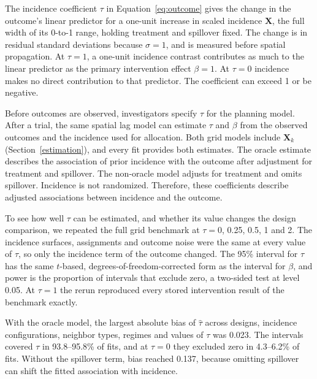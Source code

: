 \documentclass[11pt]{article}
\begin{document}
The incidence coefficient \(\tau\) in Equation~\ref{eq:outcome} gives
the change in the outcome's linear predictor for a one-unit increase in
scaled incidence \(\mathbf{X}\), the full width of its 0-to-1 range,
holding treatment and spillover fixed. The change is in residual
standard deviations because \(\sigma=1\), and is measured before
spatial propagation. At \(\tau=1\), a one-unit incidence contrast
contributes as much to the linear predictor as the primary intervention
effect \(\beta=1\). At \(\tau=0\) incidence makes no direct
contribution to that predictor. The coefficient can exceed 1 or be
negative.

Before outcomes are observed, investigators specify \(\tau\) for the
planning model. After a trial, the same spatial lag model can estimate
\(\tau\) and \(\beta\) from the observed outcomes and the incidence
used for allocation. Both grid models include \(\mathbf{X}_k\)
(Section~\ref{estimation}), and every fit provides both estimates.
The oracle estimate describes the association of prior incidence
with the outcome after adjustment for treatment and spillover. The
non-oracle model adjusts for treatment and omits spillover.
Incidence is not randomized. Therefore, these coefficients describe adjusted associations between incidence and the outcome.

To see how well \(\tau\) can be estimated, and whether its value changes the design comparison, we repeated the full grid benchmark at \(\tau = 0\), 0.25, 0.5, 1 and 2. The incidence surfaces, assignments and outcome noise were the same at every value of \(\tau\), so only the incidence term of the outcome changed. The 95\% interval for \(\tau\) has the same \(t\)-based, degrees-of-freedom-corrected form as the interval for \(\beta\), and power is the proportion of intervals that exclude zero, a two-sided test at level 0.05. At \(\tau = 1\) the rerun reproduced every stored intervention result of the benchmark exactly.

With the oracle model, the largest absolute bias of \(\hat\tau\) across designs, incidence configurations, neighbor types, regimes and values of \(\tau\) was 0.023. The intervals covered \(\tau\) in 93.8--95.8\% of fits, and at \(\tau = 0\) they excluded zero in 4.3--6.2\% of fits. Without the spillover term, bias reached 0.137, because omitting spillover can shift the fitted association with incidence.
\end{document}
